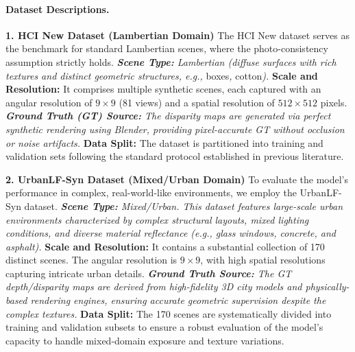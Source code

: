 \documentclass[lettersize,journal]{IEEEtran}
\begin{document}
\paragraph{Dataset Descriptions.}

\textbf{1. HCI New Dataset (Lambertian Domain)}
The HCI New dataset serves as the benchmark for standard Lambertian scenes, where the photo-consistency assumption strictly holds. 
\textit{ \textbf{Scene Type:} Lambertian (diffuse surfaces with rich textures and distinct geometric structures, e.g., }boxes\textit{, }cotton\textit{).
} \textbf{Scale and Resolution:} It comprises multiple synthetic scenes, each captured with an angular resolution of $9 \times 9$ (81 views) and a spatial resolution of $512 \times 512$ pixels.
\textit{ \textbf{Ground Truth (GT) Source:} The disparity maps are generated via perfect synthetic rendering using Blender, providing pixel-accurate GT without occlusion or noise artifacts.
} \textbf{Data Split:} The dataset is partitioned into training and validation sets following the standard protocol established in previous literature.

\textbf{2. UrbanLF-Syn Dataset (Mixed/Urban Domain)}
To evaluate the model's performance in complex, real-world-like environments, we employ the UrbanLF-Syn dataset.
\textit{ \textbf{Scene Type:} Mixed/Urban. This dataset features large-scale urban environments characterized by complex structural layouts, mixed lighting conditions, and diverse material reflectance (e.g., glass windows, concrete, and asphalt).
} \textbf{Scale and Resolution:} It contains a substantial collection of 170 distinct scenes. The angular resolution is $9 \times 9$, with high spatial resolutions capturing intricate urban details.
\textit{ \textbf{Ground Truth Source:} The GT depth/disparity maps are derived from high-fidelity 3D city models and physically-based rendering engines, ensuring accurate geometric supervision despite the complex textures.
} \textbf{Data Split:} The 170 scenes are systematically divided into training and validation subsets to ensure a robust evaluation of the model's capacity to handle mixed-domain exposure and texture variations.
\end{document}
